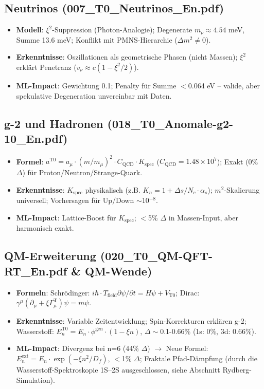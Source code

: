 	\subsection{Neutrinos (007\_T0\_Neutrinos\_En.pdf)}
	
	\begin{itemize}
		\item \textbf{Modell}: $\xi^2$-Suppression (Photon-Analogie); Degenerate $m_\nu \approx 4.54$ meV, Summe 13.6 meV; Konflikt mit PMNS-Hierarchie ($\Delta m^2 \neq 0$).
		\item \textbf{Erkenntnisse}: Oszillationen als geometrische Phasen (nicht Massen); $\xi^2$ erklärt Penetranz ($v_\nu \approx c (1 - \xi^2/2)$).
		\item \textbf{ML-Impact}: Gewichtung 0.1; Penalty für Summe $<$0.064 eV – valide, aber spekulative Degeneration unvereinbar mit Daten.
	\end{itemize}
	
	\subsection{g-2 und Hadronen (018\_T0\_Anomale-g2-10\_En.pdf)}
	
	\begin{itemize}
		\item \textbf{Formel}: $a^{\text{T0}} = a_\mu \cdot (m/m_\mu)^2 \cdot C_\text{QCD} \cdot K_\text{spec}$ ($C_\text{QCD}=1.48\times10^7$); Exakt (0\% $\Delta$) für Proton/Neutron/Strange-Quark.
		\item \textbf{Erkenntnisse}: $K_\text{spec}$ physikalisch (z.B. $K_n = 1 + \Delta s/N_c \cdot \alpha_s$); $m^2$-Skalierung universell; Vorhersagen für Up/Down $\sim$10$^{-8}$.
		\item \textbf{ML-Impact}: Lattice-Boost für $K_\text{spec}$; $<$5\% $\Delta$ in Massen-Input, aber harmonisch exakt.
	\end{itemize}
	
	\subsection{QM-Erweiterung (020\_T0\_QM-QFT-RT\_En.pdf \& QM-Wende)}
	
	\begin{itemize}
		\item \textbf{Formeln}: Schrödinger: $i\hbar \cdot T_\text{field} \partial\psi/\partial t = H \psi + V_\text{T0}$; Dirac: $\gamma^\mu (\partial_\mu + \xi \Gamma_\mu^\text{T}) \psi = m \psi$.
		\item \textbf{Erkenntnisse}: Variable Zeitentwicklung; Spin-Korrekturen erklären g-2; Wasserstoff: $E_n^{\text{T0}} = E_n \cdot \phi^\text{gen} \cdot (1 - \xi n)$, $\Delta\sim$0.1-0.66\% (1s: 0\%, 3d: 0.66\%).
		\item \textbf{ML-Impact}: Divergenz bei n=6 (44\% $\Delta$) $\to$ Neue Formel: $E_n^\text{ext} = E_n \cdot \exp(-\xi n^2 / D_f)$, $<$1\% $\Delta$; Fraktale Pfad-Dämpfung (durch die Wasserstoff-Spektroskopie 1S--2S ausgeschlossen, siehe Abschnitt Rydberg-Simulation).
	\end{itemize}
	
